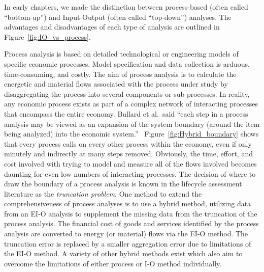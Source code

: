 In early chapters,
we made the distinction between
process-based (often called ``bottom-up'') 
and Input-Output (often called ``top-down'')
analyses.
The advantages and disadvantages of each type
of analysis are outlined in Figure~\ref{fig:IO_vs_process}.

Process analysis is based on detailed technological
or engineering models of specific economic processes.
Model specification and data collection is arduous,
time-consuming,
and costly.
The aim of process analysis is to calculate the
energetic and material flows associated with the process
under study by disaggregating the process into
several components or sub-processes.
In reality,
any economic process exists as part of a complex network of
interacting processes that encompass the entire economy.
Bullard et al.\ said 
``each step in a process analysis may be viewed as 
an expansion of the system boundary 
(around the item being analyzed) 
into the economic system.''~\cite[p.~281]{Bullard:1978vd}
Figure~\ref{fig:Hybrid_boundary} shows that 
every process calls on every other process within the economy,
even if only minutely and indirectly at many steps removed.
Obviously,
the time, 
effort,
and cost involved with trying to model and
measure all of the flows involved becomes daunting
for even low numbers of interacting processes.
The decision of where to draw the boundary of
a process analysis is known in the 
lifecycle assessment literature as the 
\emph{truncation problem}.\cite{Suh2004}
One method to extend the comprehensiveness of process
analyses is to use a hybrid method,
utilizing data from an EI-O analysis to supplement the
missing data from the truncation of the process analysis.
The financial cost of goods and services identified by
the process analysis are converted to energy
(or material) flows via the EI-O method.
The truncation error is replaced by a smaller aggregation
error due to limitations of the EI-O 
method.\cite{Bullard:1978vd}
A variety of other hybrid methods exist which also aim to
overcome the limitations of either process or I-O method 
individually.\cite{Bullard:1978vd, Suh2004, Suh2002, 
Crawford2008, Zhai2010}

